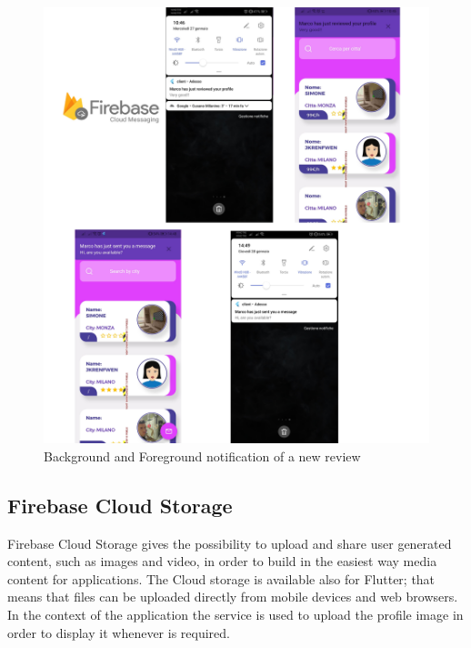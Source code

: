 \documentclass[../../dd.tex]{subfiles}
\begin{document}
    \begin{figure}[H]
        \centering
        \includegraphics[scale=0.2]{../../assets/fcm.jpg}
        \caption{Background and Foreground notification of a new review}\label{fig:widget-tests}
    \end{figure}
    
    \newpage
    \subsection{Firebase Cloud Storage}
    Firebase Cloud Storage gives the possibility to upload and share user generated content, such as images and video, in order to build in the easiest way media content for applications. The Cloud storage is available also for Flutter; that means that files can be uploaded directly from mobile devices and web browsers. In the context of the application the service is used to upload the profile image in order to display it whenever is required. 
    
\end{document}
